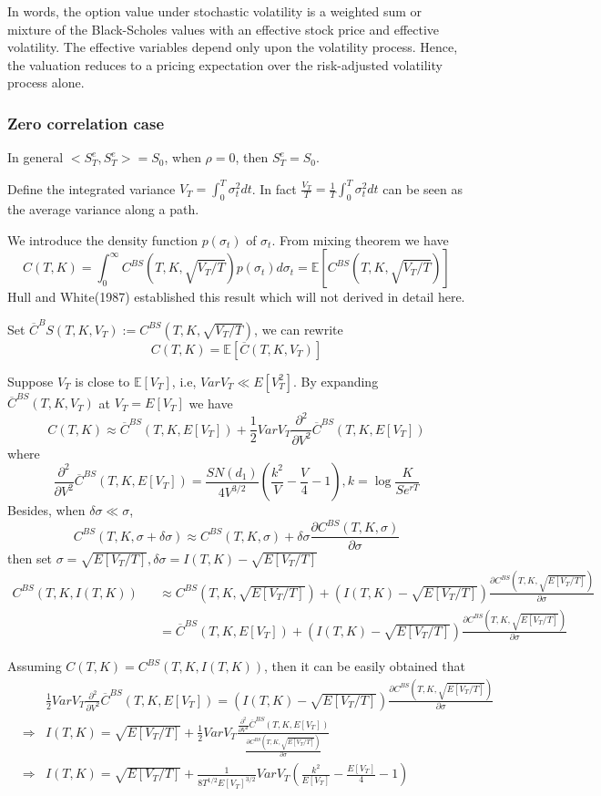 \documentclass[10pt]{article}
\theoremstyle{plain}
\numberwithin{equation}{section}
\numberwithin{table}{section}
\newcommand{\s}{\sigma}
\newcommand{\prt}[1]{\left( #1 \right)}  %
\newcommand{\de}{\delta}
\newcommand{\pa}{\partial}
\newcommand{\E}{\mathbb{E}}
\begin{document}
In words, the option value under stochastic volatility is a weighted sum or mixture of the
Black-Scholes values with an effective stock price and effective volatility. The effective
variables depend only upon the volatility process. Hence, the valuation reduces to a pricing
expectation over the risk-adjusted volatility process alone. 

\subsubsection{Zero correlation case}
In general $<S^e_T, S^e_T> = S_0$, when $\rho=0$, then $S^e_T=S_0$. 

Define the integrated variance $V_T = \int_0^T \s^2_t dt$. In fact $\frac{V_T}{T} = \frac{1}{T}\int_0^T \s^2_t dt$ can be 
seen as the average variance along a path.

We introduce the density 
function $p(\s_t)$ of $\s_t$. From mixing theorem we have
\[
    C(T,K) = \int_0^{\infty} C^{BS}(T, K, \sqrt{V_T/T}) p(\s_t) d \s_t = \E [C^{BS}(T, K, \sqrt{V_T/T})]
\]
Hull and White(1987) established this result which will not derived in detail here. 

Set $\overline{C}^BS(T,K,V_T) :=C^{BS}(T, K, \sqrt{V_T/T})$, we can rewrite
\[
    C(T,K) =  \E [\overline{C}(T,K,V_T)]  
\]

Suppose $V_T$ is close to $\E[V_T]$, i.e, $VarV_T \ll E[V_T^2]$. 
By expanding $\overline{C}^{BS}(T,K,V_T)$ at $V_T=E[V_T]$ we have 
\[
    C(T,K) \approx \overline{C}^{BS}(T, K, E[V_T]) + \frac{1}{2} VarV_T \frac{\pa^2}{\pa V^2} \overline{C}^{BS}(T,K,E[V_T])   
\]
where
\[
    \frac{\pa^2}{\pa V^2} \overline{C}^{BS}(T,K,E[V_T])  = \frac{SN(d_1)}{4V^{3/2}}\prt{ \frac{k^2}{V} - \frac{V}{4} -1 }, k=\log \frac{K}{Se^{rT}}   
\]
Besides, when $\de \s \ll \s$,
\[
    C^{BS}(T, K, \s+\de \s) \approx C^{BS}(T, K, \s) + \de \s \frac{\pa C^{BS}(T, K, \s)}{\pa \s}
\]
then set $\s=\sqrt{E[V_T/ T]}, \de \s = I(T,K) - \sqrt{E[V_T/ T]}$
\begin{eqnarray*}
    C^{BS}(T, K, I(T,K)) && \approx C^{BS}(T, K, \sqrt{E[V_T/ T]}) + \prt{I(T,K) - \sqrt{E[V_T/ T]}} \frac{\pa C^{BS}(T, K, \sqrt{E[V_T/ T]})}{\pa \s} \\
    && = \overline{C}^{BS}(T,K,E[V_T]) + \prt{I(T,K) - \sqrt{E[V_T/ T]}} \frac{\pa C^{BS}(T, K, \sqrt{E[V_T/ T]})}{\pa \s}
\end{eqnarray*}

Assuming $C(T,K) = C^{BS}(T, K, I(T,K))$, then it can be easily obtained that 
\begin{eqnarray}
    &&\frac{1}{2} VarV_T \frac{\pa^2}{\pa V^2} \overline{C}^{BS}(T,K,E[V_T])  = \prt{I(T,K) - \sqrt{E[V_T/ T]}} \frac{\pa C^{BS}(T, K, \sqrt{E[V_T/ T]})}{\pa \s} \nonumber \\
    &\Rightarrow& I(T,K) = \sqrt{E[V_T/ T]} + \frac{1}{2}  VarV_T \frac{\frac{\pa^2}{\pa V^2} \overline{C}^{BS}(T,K,E[V_T]) }{\frac{\pa C^{BS}(T, K, \sqrt{E[V_T/ T]})}{\pa \s}} \nonumber \\
    &\Rightarrow& I(T,K) = \sqrt{E[V_T/ T]} + \frac{1}{8T^{1/2}E[V_T]^{3/2}}  VarV_T \prt{ \frac{k^2}{E[V_T]} - \frac{E[V_T]}{4} -1 }
    \label{stoch_imp_vol_sym}
\end{eqnarray}
\end{document}

